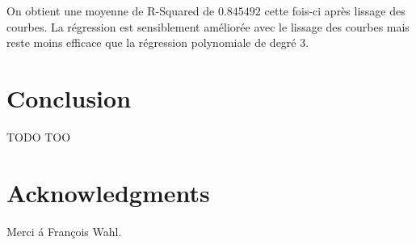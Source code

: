 \documentclass[12pt]{article}
\begin{document}
On obtient une moyenne de R-Squared de $0.845492$ cette fois-ci apr\`es lissage des courbes. La r\'egression est sensiblement am\'elior\'ee avec le lissage des courbes mais reste moins efficace que la r\'egression polynomiale de degr\'e 3.

\newpage

\section{Conclusion}

TODO TOO


\section*{Acknowledgments}
Merci \'a Fran\c cois Wahl.
\end{document}
